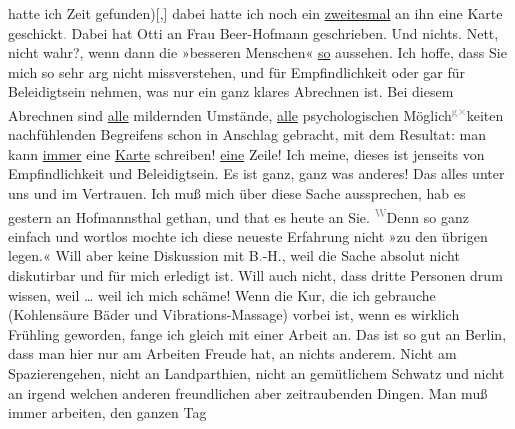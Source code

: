\begin{ledgroupsized}[t]{13cm}
               hatte ich Zeit gefunden){[},{]} dabei hatte ich noch ein \uline{zweitesmal} an ihn eine Karte
                  geschickt\textcolor{gray}{.} Dabei hat Otti an Frau Beer-Hofmann
               geschrieben. Und nichts. Nett, nicht wahr?, wenn dann die »besseren Menschen« \uline{so} aussehen. Ich hoffe, dass Sie mich so sehr arg
               nicht missverstehen, und für Empfindlichkeit oder gar für Beleidigtsein nehmen, was
               nur ein ganz klares Abrechnen ist. Bei diesem Abrechnen sind \uline{alle} mildernden Umstände, \uline{alle}
               psychologischen Möglich\substVorne{}\textsuperscript{\textcolor{gray}{g}\textcolor{gray}{×}}\substDazwischen{}k\substHinten{}eiten nachfühlenden Begreifens schon in Anschlag gebracht, mit dem Resultat:
               man kann \uline{immer} eine \uline{Karte} schreiben! \uline{eine} Zeile! Ich meine,
               dieses ist jenseits von Empfindlichkeit und Beleidigtsein. Es ist ganz, ganz was
               anderes! Das alles unter uns und im Vertrauen. Ich muß mich über diese Sache
               aussprechen, hab es gestern an Hofmannsthal gethan, und that es heute an Sie. \substVorne{}\textsuperscript{\textcolor{gray}{W}}\substDazwischen{}De\substHinten{}nn so ganz einfach und wortlos mochte ich diese neueste Erfahrung nicht »zu
               den übrigen legen.« Will aber keine Diskussion mit B\textcolor{gray}{.}-H., weil die Sache absolut nicht diskutirbar und
               für mich erledigt ist. Will auch nicht, dass dritte Personen drum wissen, weil {\dots} weil ich mich schäme!\pend
           \pstart
           Wenn die Kur, die ich gebrauche (Kohlensäure Bäder und Vibrations-Massage) vorbei
               ist, wenn es wirklich Frühling geworden, fange ich gleich mit einer Arbeit an. Das
               ist so gut an Berlin, dass man hier nur am
               Arbeiten Freude hat, an nichts anderem. Nicht am Spazierengehen, nicht an
               Landparthien, nicht an gemütlichem Schwatz und nicht an irgend welchen anderen
               freundlichen aber zeitraubenden Dingen. Man muß immer arbeiten, den ganzen Tag

\end{ledgroupsized}
